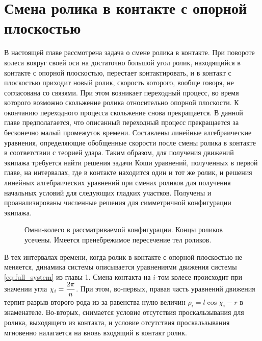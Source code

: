 \chapter{Смена ролика в контакте с опорной плоскостью}


В настоящей главе рассмотрена задача о смене ролика в контакте. При повороте колеса вокруг своей оси на достаточно большой угол ролик, находящийся в контакте с опорной плоскостью, перестает контактировать, и в контакт с плоскостью приходит новый ролик, скорость которого, вообще говоря, не согласована со связями. При этом возникает переходный процесс, во время которого возможно скольжение ролика относительно опорной плоскости. К окончанию переходного процесса скольжение снова прекращается. В данной главе предполагается, что описанный переходный процесс прекращается за бесконечно малый промежуток времени. Составлены линейные алгебраические уравнения, определяющие обобщенные скорости после смены ролика в контакте в соответствии с теорией удара. Таким образом, для получения движений экипажа требуется найти решения задачи Коши уравнений, полученных в первой главе, на интервалах, где в контакте находится один и тот же ролик, и решения линейных алгебраических уравнений при сменах роликов для получения начальных условий для следующих гладких участков. Получены и проанализированы численные решения для симметричной конфигурации экипажа.

\begin{figure}
    \minipage{\textwidth}
        \centering
        \caption{Омни-колесо в рассматриваемой конфигурации. Концы роликов усечены. Имеется пренебрежимое пересечение тел роликов.}
        \label{fig:overlap}
    \endminipage
\end{figure}

В тех интервалах времени, когда ролик в контакте с опорной плоскостью не меняется, динамика системы описывается уравнениями движения системы \ref{eq:full_system} из главы 1. Смена контакта на $i$-том колесе происходит при значении угла $\chi_i = \displaystyle\frac{\displaystyle 2\pi}{\displaystyle n}$. При этом, во-первых, правая часть уравнений движения терпит разрыв второго рода из-за равенства нулю величин $\rho_i = l\cos\chi_i-r$ в знаменателе. Во-вторых, снимается условие отсутствия проскальзывания для ролика, выходящего из контакта, и условие отсутствия проскальзывания мгновенно налагается на вновь входящий в контакт ролик.

